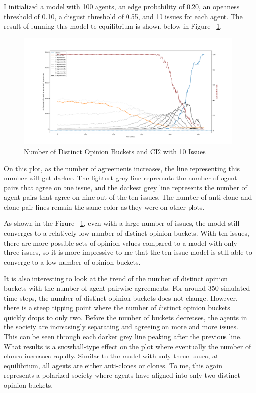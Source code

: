 I initialized a model with 100 agents, an edge probability of 0.20, an openness threshold of 0.10, a disgust threshold of 0.55, and 10 issues for each agent. The result of running this model to equilibrium is shown below in Figure ~\ref{H3_census10_CI2}. 

\begin{figure}
\centering
\includegraphics[width=1.0\columnwidth]{./Graphs/census10CI2.png}
\caption{Number of Distinct Opinion Buckets and CI2 with 10 Issues}
\label{H3_census10_CI2}
\end{figure}

On this plot, as the number of agreements increases, the line representing this number will get darker. The lightest grey line represents the number of agent pairs that agree on one issue, and the darkest grey line represents the number of agent pairs that agree on nine out of the ten issues. The number of anti-clone and clone pair lines remain the same color as they were on other plots. 

As shown in the Figure ~\ref{H3_census10_CI2}, even with a large number of issues, the model still converges to a relatively low number of distinct opinion buckets. With ten issues, there are more possible sets of opinion values compared to a model with only three issues, so it is more impressive to me that the ten issue model is still able to converge to a low number of opinion buckets. 

It is also interesting to look at the trend of the number of distinct opinion buckets with the number of agent pairwise agreements. For around 350 simulated time steps, the number of distinct opinion buckets does not change. However, there is a steep tipping point where the number of distinct opinion buckets quickly drops to only two. Before the number of buckets decreases, the agents in the society are increasingly separating and agreeing on more and more issues. This can be seen through each darker grey line peaking after the previous line. What results is a snowball-type effect on the plot where eventually the number of clones increases rapidly. Similar to the model with only three issues, at equilibrium, all agents are either anti-clones or clones. To me, this again represents a polarized society where agents have aligned into only two distinct opinion buckets.   

